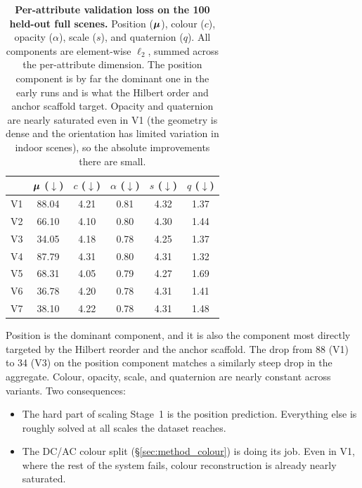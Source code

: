 \begin{table}[t]
  \centering
  \caption[Per-attribute loss breakdown]{\textbf{Per-attribute validation loss on the 100 held-out full scenes.} Position ($\boldsymbol{\mu}$), colour ($c$), opacity ($\alpha$), scale ($s$), and quaternion ($q$). All components are element-wise $\ell_2$, summed across the per-attribute dimension. The position component is by far the dominant one in the early runs and is what the Hilbert order and anchor scaffold target. Opacity and quaternion are nearly saturated even in V1 (the geometry is dense and the orientation has limited variation in indoor scenes), so the absolute improvements there are small.}
  \label{tab:components}
  {\small
  \begin{tabular}{lccccc}
    \toprule
        & $\boldsymbol{\mu}$ ($\downarrow$) & $c$ ($\downarrow$) & $\alpha$ ($\downarrow$) & $s$ ($\downarrow$) & $q$ ($\downarrow$) \\
    \midrule
    V1  & 88.04 & 4.21 & 0.81 & 4.32 & 1.37 \\
    V2  & 66.10 & 4.10 & 0.80 & 4.30 & 1.44 \\
    V3  & 34.05 & 4.18 & 0.78 & 4.25 & 1.37 \\
    V4  & 87.79 & 4.31 & 0.80 & 4.31 & 1.32 \\
    V5  & 68.31 & 4.05 & 0.79 & 4.27 & 1.69 \\
    V6  & 36.78 & 4.20 & 0.78 & 4.31 & 1.41 \\
    V7  & 38.10 & 4.22 & 0.78 & 4.31 & 1.48 \\
    \bottomrule
  \end{tabular}}
\end{table}

Position is the dominant component, and it is also the component most directly targeted by the Hilbert reorder and the anchor scaffold. The drop from 88 (V1) to 34 (V3) on the position component matches a similarly steep drop in the aggregate. Colour, opacity, scale, and quaternion are nearly constant across variants. Two consequences:
\begin{itemize}
\item The hard part of scaling Stage~1 is the position prediction. Everything else is roughly solved at all scales the dataset reaches.
\item The DC/AC colour split (\S\ref{sec:method_colour}) is doing its job. Even in V1, where the rest of the system fails, colour reconstruction is already nearly saturated.
\end{itemize}

